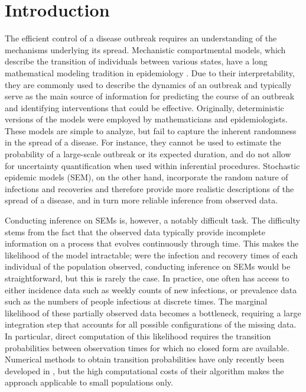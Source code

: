 \documentclass[11pt]{article}
\begin{document}
	\section{Introduction}
	
	The efficient control of a disease outbreak requires an understanding of the mechanisms underlying its spread. Mechanistic compartmental models, which describe the transition of individuals between various states, have a long mathematical modeling tradition in epidemiology \cite{Kermack.1927}. Due to their interpretability, they are commonly used to describe the dynamics of an outbreak and typically serve as the main source of information for predicting the course of an outbreak and identifying interventions that could be effective. Originally, deterministic versions of the models were employed by mathematicians and epidemiologists. These models are simple to analyze, but fail to capture the inherent randomness in the spread of a disease. For instance, they cannot be used to estimate the probability of a large-scale outbreak or its expected duration, and do not allow for uncertainty quantification when used within inferential procedures. Stochastic epidemic models (SEM), on the other hand, incorporate the random nature of infections and recoveries and therefore provide more realistic descriptions of the spread of a disease, and in turn more reliable inference from observed data.
		
	Conducting inference on SEMs is, however, a notably difficult task. The difficulty stems from the fact that the observed data typically provide incomplete information on a process that evolves continuously through time. This makes the likelihood of the model intractable; were the infection and recovery times of each individual of the population observed, conducting inference on SEMs would be straightforward, but this is rarely the case. In practice, one often has access to either incidence data such as weekly counts of new infections, or prevalence data such as the numbers of people infectious at discrete times. The marginal likelihood of these partially observed data becomes a bottleneck, requiring a large integration step that accounts for all possible configurations of the missing data. In particular, direct computation of this likelihood requires the transition probabilities between observation times for which no closed form are available. Numerical methods to obtain transition probabilities have only recently been developed in \cite{Ho.2018b, Ho.2018}, but the high computational costs of their algorithm makes the approach applicable to small populations only. 
				
\end{document}
